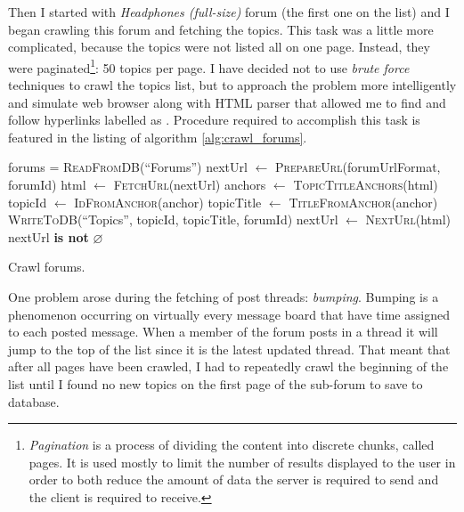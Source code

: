     Then I started with \emph{Headphones (full-size)} forum (the first one on the list) and I began crawling this forum and fetching the topics. This task was a little more complicated, because the topics were not listed all on one page. Instead, they were paginated\footnote{\emph{Pagination} is a process of dividing the content into discrete chunks, called pages. It is used mostly to limit the number of results displayed to the user in order to both reduce the amount of data the server is required to send and the client is required to receive.}: 50 topics per page. I have decided not to use \emph{brute force} techniques to crawl the topics list, but to approach the problem more intelligently and simulate web browser along with HTML parser that allowed me to find and follow hyperlinks labelled as . Procedure required to accomplish this task is featured in the listing of algorithm \ref{alg:crawl_forums}.
  
    \begin{algorithm}[H]
      \begin{algorithmic}[1]
          \State forums = \textsc{ReadFromDB}(``Forums'') 
            \State nextUrl $\gets$ \textsc{PrepareUrl}(forumUrlFormat, forumId)
            \Repeat
              \State html $\gets$ \textsc{FetchUrl}(nextUrl)
              \State anchors $\gets$ \textsc{TopicTitleAnchors}(html)
                \State topicId $\gets$ \textsc{IdFromAnchor}(anchor)
                \State topicTitle $\gets$ \textsc{TitleFromAnchor}(anchor)
                \State \textsc{WriteToDB}(``Topics'', topicId, topicTitle, forumId)
              \EndFor
              \State nextUrl $\gets$ \textsc{NextUrl}(html) 
            \Until nextUrl \textbf{is not} $\varnothing$
          \EndFor
        \EndProcedure
      \end{algorithmic}
      \caption{Crawl forums.}
      \label{alg:crawl_forums}
    \end{algorithm}
    
    One problem arose during the fetching of post threads: \emph{bumping}. Bumping is a phenomenon occurring on virtually every message board that have time assigned to each posted message. When a member of the forum posts in a thread it will jump to the top of the list since it is the latest updated thread. That meant that after all pages have been crawled, I had to repeatedly crawl the beginning of the list until I found no new topics on the first page of the sub-forum to save to database.
    
